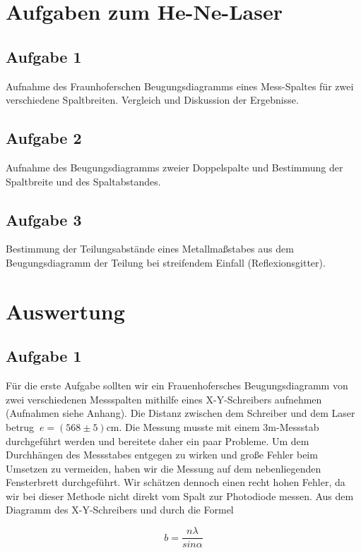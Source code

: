 \documentclass{article}
\begin{document}
\newpage

\section{Aufgaben zum He-Ne-Laser}
\subsection*{Aufgabe 1}
Aufnahme des  {\sc Fraunhoferschen Beugungsdiagramms} eines Mess-Spaltes für zwei verschiedene Spaltbreiten. Vergleich und Diskussion der Ergebnisse.
\subsection*{Aufgabe 2}
Aufnahme des Beugungsdiagramms zweier Doppelspalte und Bestimmung der Spaltbreite und des Spaltabstandes.
\subsection*{Aufgabe 3}
Bestimmung der Teilungsabstände eines Metallmaßstabes aus dem Beugungsdiagramm der Teilung bei streifendem Einfall (Reflexionsgitter).

\newpage

\section{Auswertung}


\subsection{Aufgabe 1}

Für die erste Aufgabe sollten wir ein Frauenhofersches Beugungsdiagramm von zwei verschiedenen Messspalten mithilfe eines X-Y-Schreibers aufnehmen (Aufnahmen siehe Anhang). Die Distanz zwischen dem Schreiber und dem Laser betrug \(\ e=(568 \pm 5) \)cm. Die Messung musste mit einem 3m-Messstab durchgeführt werden und bereitete daher ein paar Probleme. Um dem Durchhängen des Messstabes entgegen zu wirken und große Fehler beim Umsetzen zu vermeiden, haben wir die Messung auf dem nebenliegenden Fensterbrett durchgeführt. Wir schätzen dennoch einen recht hohen Fehler, da wir bei dieser Methode nicht direkt vom Spalt zur Photodiode messen. Aus dem Diagramm des X-Y-Schreibers und durch die Formel

\begin{equation}
\label{20}
b= \frac{n \lambda}{sin \alpha}
\end{equation}\\
\end{document}
